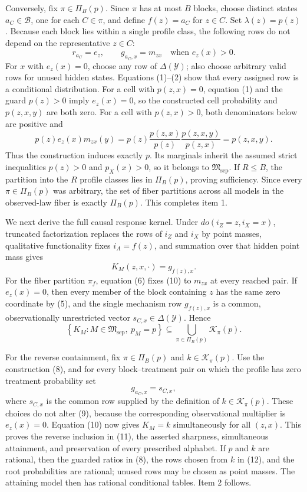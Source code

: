 Conversely, fix \(\pi\in\Pi_B(p)\).  Since \(\pi\) has at most \(B\)
blocks, choose distinct states \(a_C\in\mathcal B\), one for each
\(C\in\pi\), and define \(f(z)=a_C\) for \(z\in C\).  Set
\(\lambda(z)=p(z)\).  Because each block lies within a single profile
class, the following rows do not depend on the representative
\(z\in C\):
\[
 r_{a_C}=e_z,
 \qquad
 g_{a_C,x}=m_{zx}\quad\text{when }e_z(x)>0.
 \tag{8}
\]
For \(x\) with \(e_z(x)=0\), choose any row of
\(\Delta(\mathcal Y)\); also choose arbitrary valid rows for unused
hidden states.  Equations (1)--(2) show that every assigned row is a
conditional distribution.  For a cell with \(p(z,x)=0\), equation (1)
and the guard \(p(z)>0\) imply \(e_z(x)=0\), so the constructed cell
probability and \(p(z,x,y)\) are both zero.  For a cell with
\(p(z,x)>0\), both denominators below are positive and
\[
 p(z)e_z(x)m_{zx}(y)
 =p(z)\frac{p(z,x)}{p(z)}
       \frac{p(z,x,y)}{p(z,x)}
 =p(z,x,y).
 \tag{9}
\]
Thus the construction induces exactly \(p\).  Its marginals inherit the
assumed strict inequalities \(p(z)>0\) and \(p_X(x)>0\), so it belongs
to \(\mathfrak M_{\mathrm{sep}}\).  If \(R\leq B\), the partition into
the \(R\) profile classes lies in \(\Pi_B(p)\), proving sufficiency.
Since every \(\pi\in\Pi_B(p)\) was arbitrary, the set of fiber
partitions across all models in the observed-law fiber is exactly
\(\Pi_B(p)\).  This completes item 1.

We next derive the full causal response kernel.  Under
\(do(i_Z=z,i_X=x)\), truncated factorization replaces the rows of
\(i_Z\) and \(i_X\) by point masses, qualitative functionality fixes
\(i_A=f(z)\), and summation over that hidden point mass gives
\[
 K_M(z,x,\cdot)=g_{f(z),x}.
 \tag{10}
\]
For the fiber partition \(\pi_f\), equation (6) fixes (10) to
\(m_{zx}\) at every reached pair.  If \(e_z(x)=0\), then every member of
the block containing \(z\) has the same zero coordinate by (5), and the
single mechanism row \(g_{f(z),x}\) is a common, observationally
unrestricted vector \(s_{C,x}\in\Delta(\mathcal Y)\).  Hence
\[
 \left\{K_M:M\in\mathfrak M_{\mathrm{sep}},\ p_M=p\right\}
 \subseteq\bigcup_{\pi\in\Pi_B(p)}\mathcal K_\pi(p).
 \tag{11}
\]

For the reverse containment, fix \(\pi\in\Pi_B(p)\) and
\(k\in\mathcal K_\pi(p)\).  Use the construction (8), and for every
block--treatment pair on which the profile has zero treatment probability
set
\[
 g_{a_C,x}=s_{C,x},
 \tag{12}
\]
where \(s_{C,x}\) is the common row supplied by the definition of
\(k\in\mathcal K_\pi(p)\).  These choices do not alter (9), because the
corresponding observational multiplier is \(e_z(x)=0\).  Equation (10)
now gives \(K_M=k\) simultaneously for all \((z,x)\).  This proves the
reverse inclusion in (11), the asserted sharpness, simultaneous
attainment, and preservation of every prescribed alphabet.  If \(p\)
and \(k\) are rational, then the guarded ratios in (8), the rows chosen
from \(k\) in (12), and the root probabilities are rational; unused rows
may be chosen as point masses.  The attaining model then has rational
conditional tables.  Item 2 follows.

